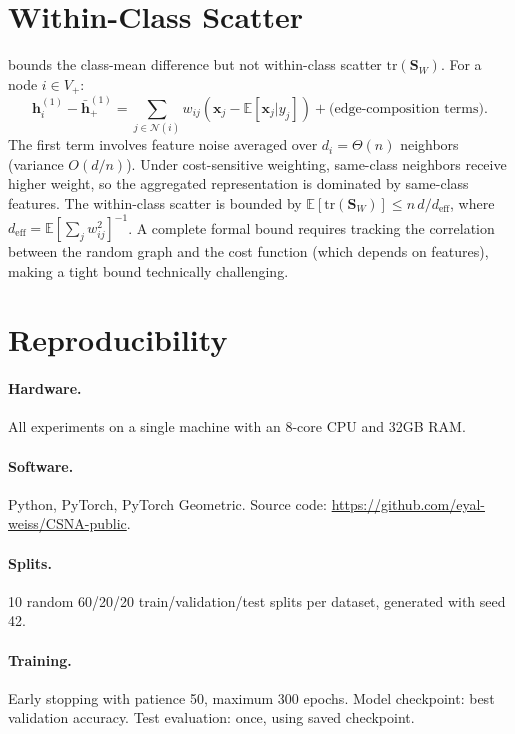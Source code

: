 \documentclass[runningheads]{llncs}
\newcommand{\N}{\mathcal{N}}
\newcommand{\E}{\mathbb{E}}
\newcommand{\bx}{\mathbf{x}}
\newcommand{\bh}{\mathbf{h}}
\begin{document}
\section{Within-Class Scatter}\label{app:within_class}

 bounds the class-mean difference but not within-class scatter $\mathrm{tr}(\mathbf{S}_W)$.
For a node $i \in V_+$:
\begin{equation}
    \bh_i^{(1)} - \bar{\bh}_+^{(1)} = \sum_{j \in \N(i)} w_{ij}(\bx_j - \E[\bx_j | y_j]) + \text{(edge-composition terms)}.
\end{equation}
The first term involves feature noise averaged over $d_i = \Theta(n)$ neighbors (variance $O(d/n)$).
Under cost-sensitive weighting, same-class neighbors receive higher weight, so the aggregated representation is dominated by same-class features.
The within-class scatter is bounded by $\E[\mathrm{tr}(\mathbf{S}_W)] \leq n\, d / d_{\mathrm{eff}}$, where $d_{\mathrm{eff}} = \E[\sum_{j} w_{ij}^2]^{-1}$.
A complete formal bound requires tracking the correlation between the random graph and the cost function (which depends on features), making a tight bound technically challenging.


\section{Reproducibility}\label{app:repro}

\paragraph{Hardware.} All experiments on a single machine with an 8-core CPU and 32GB RAM.

\paragraph{Software.} Python, PyTorch, PyTorch Geometric.
Source code: \url{https://github.com/eyal-weiss/CSNA-public}.

\paragraph{Splits.} 10 random 60/20/20 train/validation/test splits per dataset, generated with seed 42.

\paragraph{Training.} Early stopping with patience 50, maximum 300 epochs.
Model checkpoint: best validation accuracy.
Test evaluation: once, using saved checkpoint.
\end{document}
